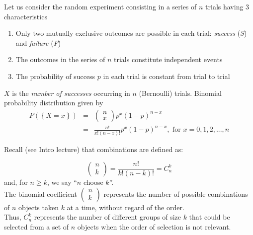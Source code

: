 \documentclass[smaller, handout]{beamer}\usepackage[]{graphicx}\usepackage[]{color}
\newenvironment{stepenumerate}{\begin{enumerate}[<+->]}{\end{enumerate}}
\begin{document}
\begin{frame}{\secname}%


\begin{definition}
Let us consider the  random experiment consisting in a series of $n$ trials having 3
characteristics

\begin{stepenumerate}
\item Only two mutually exclusive outcomes are possible in each trial: \emph{%
success} (\emph{S}) and \emph{failure} (\emph{F})

\item The outcomes in the series of $n$ trials constitute independent events

\item The probability of success $p$ in each trial is constant from trial to
trial
\end{stepenumerate}

$X$ is the \emph{number of successes} occurring in $n$ (Bernoulli) trials. Binomial probability distribution given by%
\begin{eqnarray}
P ( \left\{ X=x\right\})  &=&\left(
\begin{array}{c}
n \nonumber \\
x%
\end{array}%
\right) p^{x}\left( 1-p\right) ^{n-x} \\
&=&\frac{n!}{x!\left( n-x\right) !}p^{x}\left( 1-p\right) ^{n-x},\text{ for }%
x=0,1,2,...,n \label{Eq: Binom}
\end{eqnarray}
\end{definition}

\end{frame}%


\begin{frame}{\secname}%


Recall (see Intro lecture) that combinations are defined as:

\begin{equation*}
\left(
\begin{array}{c}
n \\
k%
\end{array}%
\right) =\frac{n!}{k!\left( n-k\right) !}=C^{k}_{n}
\end{equation*}
and, for $n \geq k$, we say ``$n$ choose $k$''. \\
\vspace{0.4cm}
The binomial coefficient $\left(
\begin{array}{c}
n \\
k%
\end{array}%
\right)$
represents the number of possible combinations of $n$ objects taken $k$ at a time, without regard of the order. \\%
\vspace{0.4cm}
\color{blue} Thus, $C^{k}_{n}$ represents the number of different groups of size $k$ that could be selected from a set of $n$ objects
when the order of selection is not relevant. \color{black}

\end{frame}%
\end{document}
